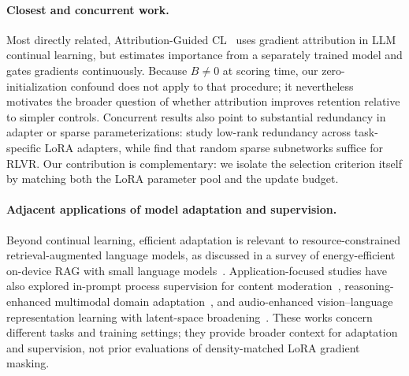 \paragraph{Closest and concurrent work.}
Most directly related, Attribution-Guided CL~\citep{liu2026attributionguided} uses gradient attribution in LLM continual learning, but estimates importance from a separately trained model and gates gradients continuously. Because $B\neq0$ at scoring time, our zero-initialization confound does not apply to that procedure; it nevertheless motivates the broader question of whether attribution improves retention relative to simpler controls. Concurrent results also point to substantial redundancy in adapter or sparse parameterizations: \citet{dieudonne2026adapter} study low-rank redundancy across task-specific LoRA adapters, while \citet{adewuyi2026multiple} find that random sparse subnetworks suffice for RLVR. Our contribution is complementary: we isolate the selection criterion itself by matching both the LoRA parameter pool and the update budget.

\paragraph{Adjacent applications of model adaptation and supervision.}
Beyond continual learning, efficient adaptation is relevant to resource-constrained retrieval-augmented language models, as discussed in a survey of energy-efficient on-device RAG with small language models~\citep{cheng2026toward}. Application-focused studies have also explored in-prompt process supervision for content moderation~\citep{liu-etal-2026-ips}, reasoning-enhanced multimodal domain adaptation~\citep{wang-etal-2025-reasoning-enhanced}, and audio-enhanced vision--language representation learning with latent-space broadening~\citep{10.1145/3711896.3737195}. These works concern different tasks and training settings; they provide broader context for adaptation and supervision, not prior evaluations of density-matched LoRA gradient masking.
